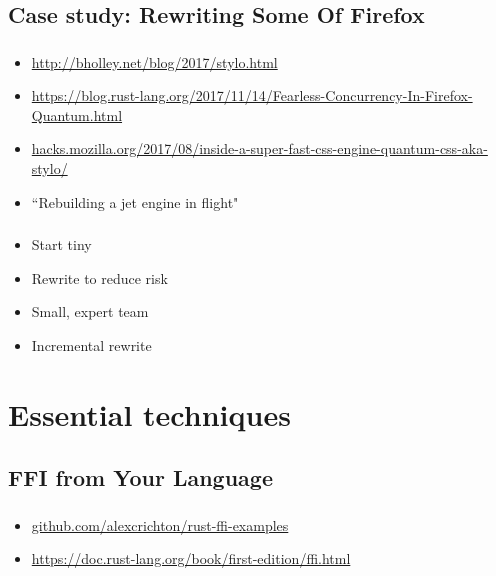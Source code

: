 \documentclass{beamer}
\begin{document}
\subsection{Case study: Rewriting Some Of Firefox}

\begin{frame}[fragile]
\frametitle{\insertsubsectionhead}
\begin{itemize}[<+(1)->]
\item \url{http://bholley.net/blog/2017/stylo.html}
\item \url{https://blog.rust-lang.org/2017/11/14/Fearless-Concurrency-In-Firefox-Quantum.html}
\item \url{hacks.mozilla.org/2017/08/inside-a-super-fast-css-engine-quantum-css-aka-stylo/}
\item ``Rebuilding a jet engine in flight"
\end{itemize}
\end{frame}

\begin{frame}[fragile]
\frametitle{\insertsubsectionhead}
\begin{itemize}[<+(1)->]
\item Start tiny
\item Rewrite to reduce risk
\item Small, expert team
\item Incremental rewrite
\end{itemize}
\end{frame}


\section{Essential techniques}

\begin{frame}[fragile]
\tableofcontents [currentsection]
\end{frame}
\subsection{FFI from Your Language}

\begin{frame}[fragile]
\tableofcontents[currentsubsection]
\end{frame}


\begin{frame}[fragile]
\frametitle{\insertsubsectionhead}
\begin{itemize}[<+(1)->]
\item \url{github.com/alexcrichton/rust-ffi-examples}
\item \url{https://doc.rust-lang.org/book/first-edition/ffi.html}
\end{itemize}
\end{frame}
\end{document}
